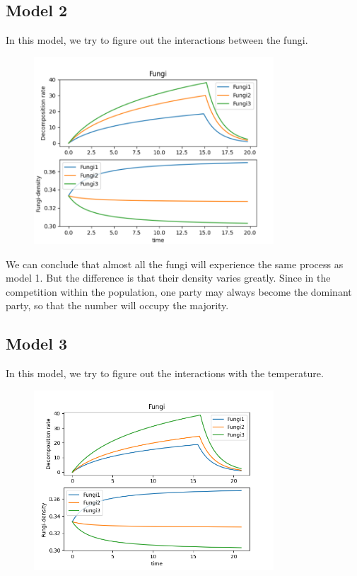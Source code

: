 \documentclass{mcmthesis}
\begin{document}
\subsection{Model 2}
In this model, we try to figure out the interactions between the fungi.
\begin{figure}[H]
  \centering
  \includegraphics[width=0.8\textwidth]{figures/Model 2.png}
\end{figure}
We can conclude that almost all the fungi will experience the same process as model 1.
But the difference is that their density varies greatly.
Since in the competition within the population, one party may always become the dominant party, so that the number will occupy the majority.

\subsection{Model 3}
In this model, we try to figure out the interactions with the temperature.
\begin{figure}[H]
  \centering
  \includegraphics[width=0.8\textwidth]{figures/Model 3.png}
\end{figure}
\end{document}
